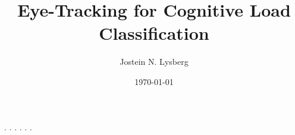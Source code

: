 \documentclass[american,titlepage]{ntnuthesis}
\title{Eye-Tracking for Cognitive Load Classification}
\author{Jostein N. Lysberg}
\date{\today}
\begin{document}




\tableofcontents


\printnoidxglossaries

% 
% 

{.}
{.}
{.}
{.}
{.}
{.}
% 
% 
% 
% 

\chapter*{\bibname}
\printbibliography[heading=none]

\appendix

\end{document}
